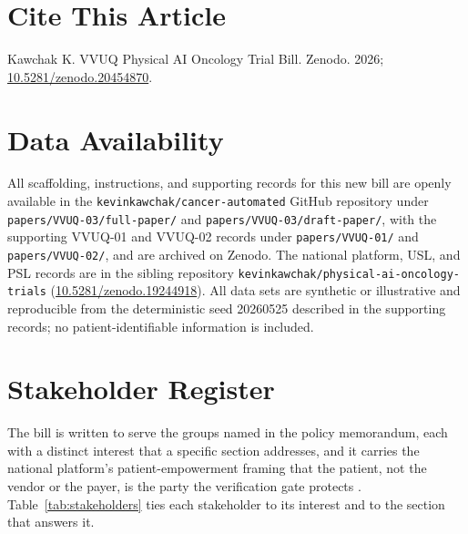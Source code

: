 \section*{Cite This Article}
\label{sec:cite}
\vspace{-0.15cm}
Kawchak K. VVUQ Physical AI Oncology Trial Bill. Zenodo. 2026;
\href{https://doi.org/10.5281/zenodo.20454870}{10.5281/zenodo.20454870}.
\vspace{-0.1cm}
{}
\section*{Data Availability}
\label{sec:data}
\vspace{-0.15cm}
All scaffolding, instructions, and supporting records for this new bill are openly
available in the \texttt{kevinkawchak/cancer-automated} GitHub repository under
\texttt{papers/VVUQ-03/full-paper/} and \texttt{papers/VVUQ-03/draft-paper/},
with the supporting VVUQ-01 and VVUQ-02 records under \texttt{papers/VVUQ-01/}
and \texttt{papers/VVUQ-02/}, and are archived on Zenodo. The national platform,
USL, and PSL records are in the sibling repository
\texttt{kevinkawchak/physical-ai-oncology-trials}
(\href{https://doi.org/10.5281/zenodo.19244918}{10.5281/zenodo.19244918}). All
data sets are synthetic or illustrative and reproducible from the deterministic
seed 20260525 described in the supporting records; no patient-identifiable
information is included.

\vspace{-0.1cm}
{}
\section*{Stakeholder Register}
\label{sec:stakeholders}
\vspace{-0.15cm}
The bill is written to serve the groups named in the policy memorandum, each with
a distinct interest that a specific section addresses, and it carries the
national platform's patient-empowerment framing that the patient, not the vendor
or the payer, is the party the verification gate protects
\cite{kawchak2026national}. Table~\ref{tab:stakeholders} ties each stakeholder to
its interest and to the section that answers it.

\clearpage

